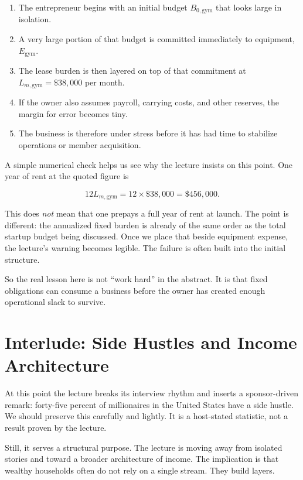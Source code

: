 \begin{enumerate}
\item The entrepreneur begins with an initial budget \(B_{0,\mathrm{gym}}\) that looks large in isolation.
\item A very large portion of that budget is committed immediately to equipment, \(E_{\mathrm{gym}}\).
\item The lease burden is then layered on top of that commitment at \(L_{m,\mathrm{gym}}=\$38{,}000\) per month.
\item If the owner also assumes payroll, carrying costs, and other reserves, the margin for error becomes tiny.
\item The business is therefore under stress before it has had time to stabilize operations or member acquisition.
\end{enumerate}

A simple numerical check helps us see why the lecture insists on this point. One year of rent at the quoted figure is

\begin{equation}
12L_{m,\mathrm{gym}} = 12 \times \$38{,}000 = \$456{,}000.
\end{equation}

This does \emph{not} mean that one prepays a full year of rent at launch. The point is different: the annualized fixed burden is already of the same order as the total startup budget being discussed. Once we place that beside equipment expense, the lecture's warning becomes legible. The failure is often built into the initial structure.

So the real lesson here is not ``work hard'' in the abstract. It is that fixed obligations can consume a business before the owner has created enough operational slack to survive.

\section{Interlude: Side Hustles and Income Architecture}

At this point the lecture breaks its interview rhythm and inserts a sponsor-driven remark: forty-five percent of millionaires in the United States have a side hustle. We should preserve this carefully and lightly. It is a host-stated statistic, not a result proven by the lecture.

Still, it serves a structural purpose. The lecture is moving away from isolated stories and toward a broader architecture of income. The implication is that wealthy households often do not rely on a single stream. They build layers.

